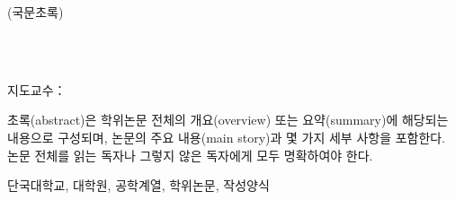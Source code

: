   {\hfill\fontsize{12}{12}\selectfont (국문초록)\par}
  \vspace{2mm}
  \begingroup
  \centering
    {\fontsize{20}{20}\selectfont \printthesistitleko \\ [1.5mm]}
    {\fontsize{15}{15}\selectfont \printthesistitlekosub \\}
  \endgroup
  \vspace{10mm}
  {\hfill\fontsize{14}{14}\selectfont \printgradschool \quad \printdepartment \par}
  {\hfill\fontsize{14}{14}\selectfont \printmajor \par}
  {\hfill\fontsize{14}{14}\selectfont \printauthorname \par}
  {\hfill\fontsize{14}{14}\selectfont 지도교수：\printadvisorname \par}
  \vspace{5mm}

  \begingroup
  \fontsize{12}{12}\selectfont
  초록(abstract)은 학위논문 전체의 개요(overview) 또는 요약(summary)에 해당되는 내용으로 구성되며, 논문의 주요 내용(main story)과 몇 가지 세부 사항을 포함한다. 논문 전체를 읽는 독자나 그렇지 않은 독자에게 모두 명확하여야 한다.
  \par
  \endgroup
  \vspace{4mm}
   {\fontsize{12}{12}\selectfont 단국대학교, 대학원, 공학계열, 학위논문, 작성양식}